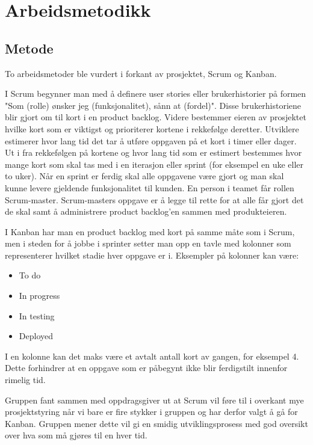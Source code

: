 \chapter{Arbeidsmetodikk}
\section{Metode}
To arbeidsmetoder ble vurdert i forkant av prosjektet, Scrum og Kanban.

I Scrum begynner man med å definere user stories eller brukerhistorier på formen "Som (rolle) ønsker jeg (funksjonalitet), sånn at (fordel)". Disse brukerhistoriene blir gjort om til kort i en product backlog. Videre bestemmer eieren av prosjektet hvilke kort som er viktigst og prioriterer kortene i rekkefølge deretter. Utviklere estimerer hvor lang tid det tar å utføre oppgaven på et kort i timer eller dager. Ut i fra rekkefølgen på kortene og hvor lang tid som er estimert bestemmes hvor mange kort som skal tas med i en iterasjon eller sprint (for eksempel en uke eller to uker). Når en sprint er ferdig skal alle oppgavene være gjort og man skal kunne levere gjeldende funksjonalitet til kunden. En person i teamet får rollen Scrum-master. Scrum-masters oppgave er å legge til rette for at alle får gjort det de skal samt å administrere product backlog'en sammen med produkteieren.

I Kanban har man en product backlog med kort på samme måte som i Scrum, men i steden for å jobbe i sprinter setter man opp en tavle med kolonner som representerer hvilket stadie hver oppgave er i. Eksempler på kolonner kan være:
\begin{itemize}
\item To do
\item In progress
\item In testing
\item Deployed
\end{itemize}
I en kolonne kan det maks være et avtalt antall kort av gangen, for eksempel 4. Dette forhindrer at en oppgave som er påbegynt ikke blir ferdigstilt innenfor rimelig tid.

Gruppen fant sammen med oppdragsgiver ut at Scrum vil føre til i overkant mye prosjektstyring når vi bare er fire stykker i gruppen og har derfor valgt å gå for Kanban. Gruppen mener dette vil gi en smidig utviklingsprosess med god oversikt over hva som må gjøres til en hver tid.

